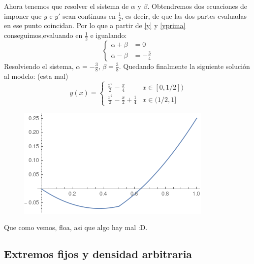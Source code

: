 Ahora tenemos que resolver el sistema de $\alpha$ y $\beta$. Obtendremos dos ecuaciones de imponer que $y$ e $y'$ sean continuas en $\frac{1}{2}$, es decir, de que las dos partes evaluadas en ese punto coincidan. Por lo que a partir de \eqref{y} y \eqref{yprima} conseguimos,evaluando en $\frac{1}{2}$ e igualando:
\begin{equation}
\left\{
\begin{array}{cc}
\alpha+\beta & =0 \\
\alpha-\beta & =-\frac{3}{4}
\end{array}
\right.
\end{equation}
Resolviendo el sistema, $\alpha=-\frac{3}{8}$, $\beta=\frac{3}{8}$. Quedando finalmente la siguiente solución al modelo: (esta mal)
\begin{equation}\label{y}
y(x)=\left\{
\begin{array}{cc}
\frac{x^2}{2}-\frac{x}{4} & x\in[0,1/2]) \\
\frac{x^2}{2}-\frac{x}{2}+\frac{1}{4} & x\in(1/2,1]
\end{array}
\right.
\end{equation}

\begin{figure}[h]
   \center
  \includegraphics[scale=0.6]{img/puenteflotante.png}
\end{figure}

Que como vemos, floa, asi que algo hay mal :D.

\subsection{Extremos fijos y densidad arbitraria}

